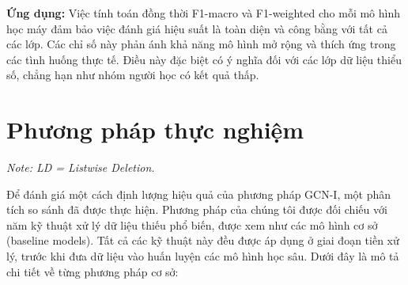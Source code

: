 \textbf{Ứng dụng:} Việc tính toán đồng thời F1-macro và F1-weighted cho mỗi mô hình học máy đảm bảo việc đánh giá hiệu suất là toàn diện và công bằng với tất cả các lớp. Các chỉ số này phản ánh khả năng mô hình mở rộng và thích ứng trong các tình huống thực tế. Điều này đặc biệt có ý nghĩa đối với các lớp dữ liệu thiểu số, chẳng hạn như nhóm người học có kết quả thấp.
\section{Phương pháp thực nghiệm}
\begin{table}[!htbp]
\centering
\caption{Preprocessing Strategies and Baseline Models}
\label{tab:baseline-models}
\scriptsize
\renewcommand{\arraystretch}{1.2}
\setlength{\tabcolsep}{1pt}
\vspace{0.5em}
\raggedright \scriptsize
\textit{Note: LD = Listwise Deletion.}
\end{table}
Để đánh giá một cách định lượng hiệu quả của phương pháp GCN-I, một phân tích so sánh đã được thực hiện. Phương pháp của chúng tôi được đối chiếu với năm kỹ thuật xử lý dữ liệu thiếu phổ biến, được xem như các mô hình cơ sở (baseline models). Tất cả các kỹ thuật này đều được áp dụng ở giai đoạn tiền xử lý, trước khi đưa dữ liệu vào huấn luyện các mô hình học sâu. Dưới đây là mô tả chi tiết về từng phương pháp cơ sở:

